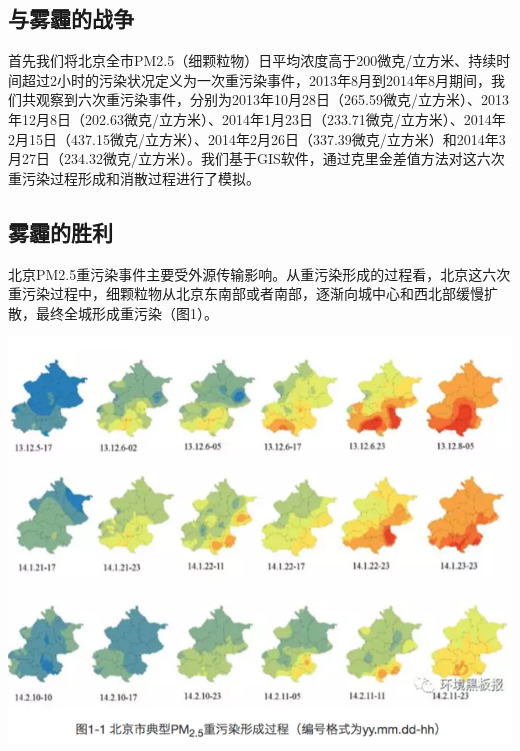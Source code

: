 \documentclass[
]{book}
\begin{document}
\hypertarget{ux4e0eux96feux973eux7684ux6218ux4e89}{%
\subsection{与雾霾的战争}\label{ux4e0eux96feux973eux7684ux6218ux4e89}}

首先我们将北京全市PM2.5（细颗粒物）日平均浓度高于200微克/立方米、持续时间超过2小时的污染状况定义为一次重污染事件，2013年8月到2014年8月期间，我们共观察到六次重污染事件，分别为2013年10月28日（265.59微克/立方米）、2013年12月8日（202.63微克/立方米）、2014年1月23日（233.71微克/立方米）、2014年2月15日（437.15微克/立方米）、2014年2月26日（337.39微克/立方米）和2014年3月27日（234.32微克/立方米）。我们基于GIS软件，通过克里金差值方法对这六次重污染过程形成和消散过程进行了模拟。

\hypertarget{ux96feux973eux7684ux80dcux5229}{%
\subsection{雾霾的胜利}\label{ux96feux973eux7684ux80dcux5229}}

北京PM2.5重污染事件主要受外源传输影响。从重污染形成的过程看，北京这六次重污染过程中，细颗粒物从北京东南部或者南部，逐渐向城中心和西北部缓慢扩散，最终全城形成重污染（图1）。

\includegraphics[width=8.33in]{images/windhaze1}
\end{document}
